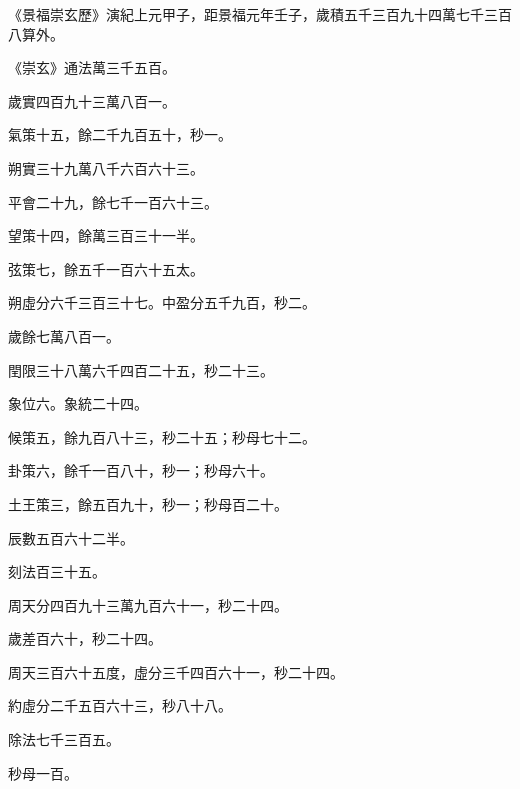 \begin{pinyinscope}
 《景福崇玄歷》演紀上元甲子，距景福元年壬子，歲積五千三百九十四萬七千三百八算外。



 《崇玄》通法萬三千五百。



 歲實四百九十三萬八百一。



 氣策十五，餘二千九百五十，秒一。



 朔實三十九萬八千六百六十三。



 平會二十九，餘七千一百六十三。



 望策十四，餘萬三百三十一半。



 弦策七，餘五千一百六十五太。



 朔虛分六千三百三十七。中盈分五千九百，秒二。



 歲餘七萬八百一。



 閏限三十八萬六千四百二十五，秒二十三。



 象位六。象統二十四。



 候策五，餘九百八十三，秒二十五；秒母七十二。



 卦策六，餘千一百八十，秒一；秒母六十。



 土王策三，餘五百九十，秒一；秒母百二十。



 辰數五百六十二半。



 刻法百三十五。



 周天分四百九十三萬九百六十一，秒二十四。



 歲差百六十，秒二十四。



 周天三百六十五度，虛分三千四百六十一，秒二十四。



 約虛分二千五百六十三，秒八十八。



 除法七千三百五。



 秒母一百。




\end{pinyinscope}

